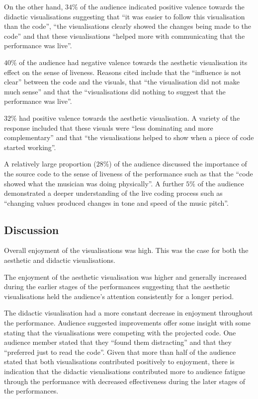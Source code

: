 \documentclass{sig-alternate}
\begin{document}
On the other hand, $34\%$ of the audience indicated positive valence towards the didactic visualisations suggesting that ``it was easier to follow this visualisation than the code'', ``the visualisations clearly showed the changes being made to the code'' and that these visualisations ``helped more with communicating that the performance was live''.

$40\%$ of the audience had negative valence towards the aesthetic visualisation its effect on the sense of liveness. Reasons cited include that the ``influence is not clear'' between the code and the visuals, that ``the visualisation did not make much sense'' and that the ``visualisations did nothing to suggest that the performance was live''.

$32\%$ had positive valence towards the aesthetic visualisation. A variety of the response included that these visuals were ``less dominating and more complementary'' and that ``the visualisations helped to show when a piece of code started working''.

A relatively large proportion ($28\%$) of the audience discussed the importance of the source code to the sense of liveness of the performance such as that the ``code showed what the musician was doing physically''. A further $5\%$ of the audience demonstrated a deeper understanding of the live coding process such as ``changing values produced changes in tone and speed of the music pitch''.

\subsection{Discussion}

Overall enjoyment of the visualisations was high. This was the case for both the aesthetic and didactic visualisations.

The enjoyment of the aesthetic visualisation was higher and generally increased during the earlier stages of the performances suggesting that the aesthetic visualisations held the audience's attention consistently for a longer period.

The didactic visualisation had a more constant decrease in enjoyment throughout the performance. Audience suggested improvements offer some insight with some stating that the visualisations were competing with the projected code. One audience member stated that they ``found them distracting'' and that they ``preferred just to read the code''. Given that more than half of the audience stated that both visualisations contributed positively to enjoyment, there is indication that the didactic visualisations contributed more to audience fatigue through the performance with decreased effectiveness during the later stages of the performances.
\end{document}
